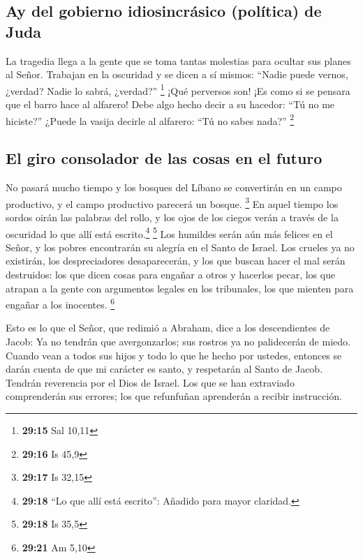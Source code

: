 \hypertarget{ay-del-gobierno-idiosincruxe1sico-poluxedtica-de-juda}{%
\subsection{Ay del gobierno idiosincrásico (política) de
Juda}\label{ay-del-gobierno-idiosincruxe1sico-poluxedtica-de-juda}}

 La tragedia llega a la gente que se toma tantas
molestias para ocultar sus planes al Señor. Trabajan en la oscuridad y
se dicen a sí mismos: ``Nadie puede vernos, ¿verdad? Nadie lo sabrá,
¿verdad?'' \footnote{\textbf{29:15} Sal 10,11}  ¡Qué
perversos son! ¡Es como si se pensara que el barro hace al alfarero!
Debe algo hecho decir a su hacedor: ``Tú no me hiciste?'' ¿Puede la
vasija decirle al alfarero: ``Tú no sabes nada?'' \footnote{\textbf{29:16}
  Is 45,9}

\hypertarget{el-giro-consolador-de-las-cosas-en-el-futuro}{%
\subsection{El giro consolador de las cosas en el
futuro}\label{el-giro-consolador-de-las-cosas-en-el-futuro}}

 No pasará mucho tiempo y los bosques del Líbano se
convertirán en un campo productivo, y el campo productivo parecerá un
bosque. \footnote{\textbf{29:17} Is 32,15}  En aquel
tiempo los sordos oirán las palabras del rollo, y los ojos de los ciegos
verán a través de la oscuridad lo que allí está escrito.\footnote{\textbf{29:18}
  ``Lo que allí está escrito'': Añadido para mayor claridad.}
\footnote{\textbf{29:18} Is 35,5}  Los humildes serán aún
más felices en el Señor, y los pobres encontrarán su alegría en el Santo
de Israel.  Los crueles ya no existirán, los
despreciadores desaparecerán, y los que buscan hacer el mal serán
destruidos:  los que dicen cosas para engañar a otros y
hacerlos pecar, los que atrapan a la gente con argumentos legales en los
tribunales, los que mienten para engañar a los inocentes. \footnote{\textbf{29:21}
  Am 5,10}

 Esto es lo que el Señor, que redimió a Abraham, dice a
los descendientes de Jacob: Ya no tendrán que avergonzarlos; sus rostros
ya no palidecerán de miedo.  Cuando vean a todos sus
hijos y todo lo que he hecho por ustedes, entonces se darán cuenta de
que mi carácter es santo, y respetarán al Santo de Jacob. Tendrán
reverencia por el Dios de Israel.  Los que se han
extraviado comprenderán sus errores; los que refunfuñan aprenderán a
recibir instrucción.

